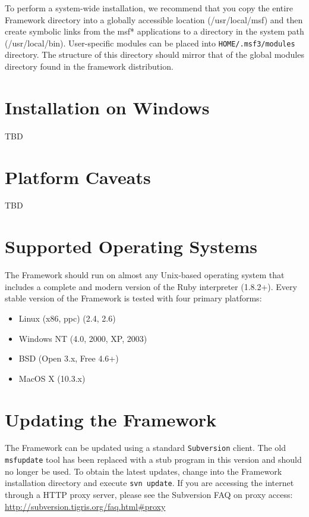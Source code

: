 \documentclass{report}
\begin{document}
\par
To perform a system-wide installation, we recommend that you copy the entire
Framework directory into a globally accessible location (/usr/local/msf) and
then create symbolic links from the msf* applications to a directory in the
system path (/usr/local/bin). User-specific modules can be placed into
\texttt{HOME/.msf3/modules} directory.  The structure of this directory should
mirror that of the global modules directory found in the framework
distribution.

    \section{Installation on Windows}
    \label{INSTALL-WIN32}

\par
TBD
   
    \section{Platform Caveats}
    \label{INSTALL-CAVEAT}

\par
TBD

    \section{Supported Operating Systems}
    \label{INSTALL-SUPPORT}

\par
The Framework should run on almost any Unix-based operating system that includes
a complete and modern version of the Ruby interpreter (1.8.2+). Every stable
version of the Framework is tested with four primary platforms: 

\begin{itemize}
\item Linux (x86, ppc) (2.4, 2.6)
\item Windows NT (4.0, 2000, XP, 2003)
\item BSD (Open 3.x, Free 4.6+)
\item MacOS X (10.3.x)
\end{itemize}

    \section{Updating the Framework}
    \label{INSTALL-UPDATE}

\par
The Framework can be updated using a standard \texttt{Subversion} client. The
old \texttt{msfupdate} tool has been replaced with a stub program in this
version and should no longer be used. To obtain the latest updates, change
into the Framework installation directory and execute \texttt{svn update}. If
you are accessing the internet through a HTTP proxy server, please see the
Subversion FAQ on proxy access: \url{http://subversion.tigris.org/faq.html#proxy}
\end{document}

